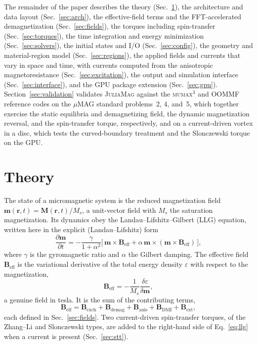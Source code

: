 \documentclass{article}      %
\newcommand{\JuliaMag}{\textsc{JuliaMag}}
\newcommand{\mumax}{\textsc{mumax}$^3$}
\newcommand{\oommf}{\textsc{OOMMF}}
\newcommand{\vm}{\bm{m}}
\newcommand{\vB}{\bm{B}}
\begin{document}
The remainder of the paper describes the theory (Sec.~\ref{sec:theory}), the
architecture and data layout (Sec.~\ref{sec:arch}), the effective-field terms and
the FFT-accelerated demagnetization (Sec.~\ref{sec:fields}), the torques
including spin-transfer (Sec.~\ref{sec:torques}), the time integration and energy
minimization (Sec.~\ref{sec:solvers}), the initial states and I/O
(Sec.~\ref{sec:config}), the geometry and material-region model
(Sec.~\ref{sec:regions}), the applied fields and currents that vary in space and
time, with currents computed from the anisotropic magnetoresistance
(Sec.~\ref{sec:excitation}), the output and simulation interface
(Sec.~\ref{sec:interface}), and the GPU package extension
(Sec.~\ref{sec:gpu}). Section~\ref{sec:validation} validates \JuliaMag{}
against the \mumax{} and \oommf{} reference codes on the $\mu$MAG standard
problems~2, 4, and~5, which together exercise the static equilibria and
demagnetizing field, the dynamic magnetization reversal, and the spin-transfer
torque, respectively, and on a current-driven vortex in a disc, which tests the
curved-boundary treatment and the Slonczewski torque on the GPU.

\section{Theory}
\label{sec:theory}

The state of a micromagnetic system is the reduced magnetization field
$\vm(\bm{r},t) = \bm{M}(\bm{r},t)/M_s$, a unit-vector field with $M_s$ the
saturation magnetization. Its dynamics obey the Landau--Lifshitz--Gilbert (LLG)
equation, written here in the explicit (Landau--Lifshitz) form
%
\begin{equation}
  \frac{\partial \vm}{\partial t}
  = -\frac{\gamma}{1+\alpha^2}
    \Big[\, \vm\times\vB_{\mathrm{eff}}
          + \alpha\,\vm\times(\vm\times\vB_{\mathrm{eff}}) \,\Big],
  \label{eq:llg}
\end{equation}
%
where $\gamma$ is the gyromagnetic ratio and $\alpha$ the Gilbert damping. The
effective field $\vB_{\mathrm{eff}}$ is the variational derivative of the total
energy density $\varepsilon$ with respect to the magnetization,
%
\begin{equation}
  \vB_{\mathrm{eff}} = -\frac{1}{M_s}\frac{\delta \varepsilon}{\delta \vm},
  \label{eq:beff}
\end{equation}
%
a genuine field in tesla. It is the sum of the contributing terms,
%
\begin{equation}
  \vB_{\mathrm{eff}}
  = \vB_{\mathrm{exch}} + \vB_{\mathrm{demag}}
  + \vB_{\mathrm{anis}} + \vB_{\mathrm{DMI}} + \vB_{\mathrm{ext}},
  \label{eq:beffsum}
\end{equation}
%
each defined in Sec.~\ref{sec:fields}. Two current-driven spin-transfer torques,
of the Zhang--Li and Slonczewski types, are added to the right-hand side of
Eq.~\eqref{eq:llg} when a current is present (Sec.~\ref{sec:stt}).
\end{document}
